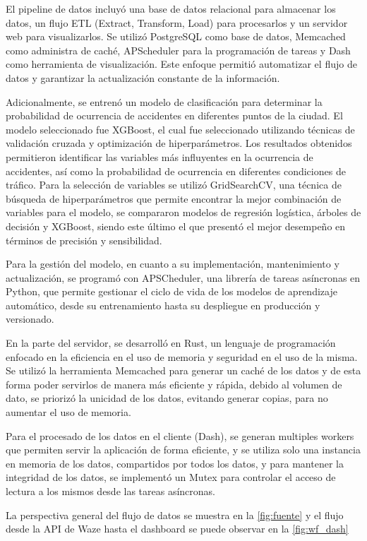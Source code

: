 \documentclass[12pt]{article}
\begin{document}
El pipeline de datos incluyó una base de datos relacional para almacenar los datos, un flujo ETL (Extract, Transform, Load) para procesarlos y un servidor web para visualizarlos. Se utilizó PostgreSQL como base de datos, Memcached como administra de caché, APScheduler para la programación de tareas y Dash como herramienta de visualización. Este enfoque permitió automatizar el flujo de datos y garantizar la actualización constante de la información.

Adicionalmente, se entrenó un modelo de clasificación para determinar la probabilidad de ocurrencia de accidentes en diferentes puntos de la ciudad. El modelo seleccionado fue XGBoost, el cual fue seleccionado utilizando técnicas de validación cruzada y optimización de hiperparámetros. Los resultados obtenidos permitieron identificar las variables más influyentes en la ocurrencia de accidentes, así como la probabilidad de ocurrencia en diferentes condiciones de tráfico. Para la selección de variables se utilizó GridSearchCV, una técnica de búsqueda de hiperparámetros que permite encontrar la mejor combinación de variables para el modelo, se compararon modelos de regresión logística, árboles de decisión y XGBoost, siendo este último el que presentó el mejor desempeño en términos de precisión y sensibilidad.

Para la gestión del modelo, en cuanto a su implementación, mantenimiento y actualización, se programó con APSCheduler, una librería de tareas asíncronas en Python, que permite gestionar el ciclo de vida de los modelos de aprendizaje automático, desde su entrenamiento hasta su despliegue en producción y versionado.

En la parte del servidor, se desarrolló en Rust, un lenguaje de programación enfocado en la eficiencia en el uso de memoria y seguridad en el uso de la misma. Se utilizó la herramienta Memcached para generar un caché de los datos y de esta forma poder servirlos de manera más eficiente y rápida, debido al volumen de dato, se priorizó la unicidad de los datos, evitando generar copias, para no aumentar el uso de memoria.

Para el procesado de los datos en el cliente (Dash), se generan multiples workers que permiten servir la aplicación de forma eficiente, y se utiliza solo una instancia en memoria de los datos, compartidos por todos los datos, y para mantener la integridad de los datos, se implementó un Mutex para controlar el acceso de lectura a los mismos desde las tareas asíncronas.

La perspectiva general del flujo de datos se muestra en la \cref{fig:fuente} y el flujo desde la API de Waze hasta el dashboard se puede observar en la \cref{fig:wf_dash}
\end{document}
